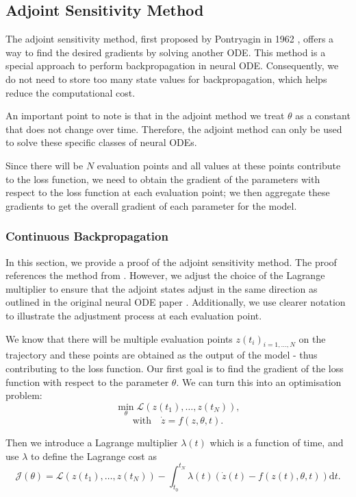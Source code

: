\documentclass[a4paper,11pt,titlepage]{article}
\theoremstyle{definition}
\theoremstyle{plain}
\theoremstyle{remark}
\begin{document}
\subsection{Adjoint Sensitivity Method}

The adjoint sensitivity method, first proposed by Pontryagin in 1962 \cite{pontryagin2018mathematical}, offers a way to find the desired gradients by solving another ODE. This method is a special approach to perform backpropagation in neural ODE. Consequently, we do not need to store too many state values for backpropagation, which helps reduce the computational cost. 

An important point to note is that in the adjoint method we treat $\theta$ as a constant that does not change over time. Therefore, the adjoint method can only be used to solve these specific classes of neural ODEs.

Since there will be $N$ evaluation points and all values at these points contribute to the loss function, we need to obtain the gradient of the parameters with respect to the loss function at each evaluation point; we then aggregate these gradients to get the overall gradient of each parameter for the model.

\subsubsection{Continuous Backpropagation}
\label{sec:contback}

In this section, we provide a proof of the adjoint sensitivity method. The proof references the method from \cite{hu2024note}. However, we adjust the choice of the Lagrange multiplier to ensure that the adjoint states adjust in the same direction as outlined in the original neural ODE paper \cite{chen2018neural}. Additionally, we use clearer notation to illustrate the adjustment process at each evaluation point.

We know that there will be multiple evaluation points $z(t_i)_{i=1,\dots,N}$ on the trajectory and these points are obtained as the output of the model - thus contributing to the loss function. Our first goal is to find the gradient of the loss function with respect to the parameter $\theta$. We can turn this into an optimisation problem:
$$
\min_{\theta} \mathcal{L}\left(z(t_1),\dots,z(t_{N})\right),
$$
$$
\mathrm{with}\quad\dot{z}=f(z,\theta,t).
$$

Then we introduce a Lagrange multiplier $\lambda(t)$ which is a function of time, and use $\lambda$ to define the Lagrange cost as
$$
\mathcal{J}(\theta) = \mathcal{L}(z(t_1),\dots,z(t_{N}))-\int^{t_N}_{t_0}\lambda(t)\left(\dot{z}(t)-f(z(t),\theta,t)\right)\mathrm{d}t.
$$
\end{document}
